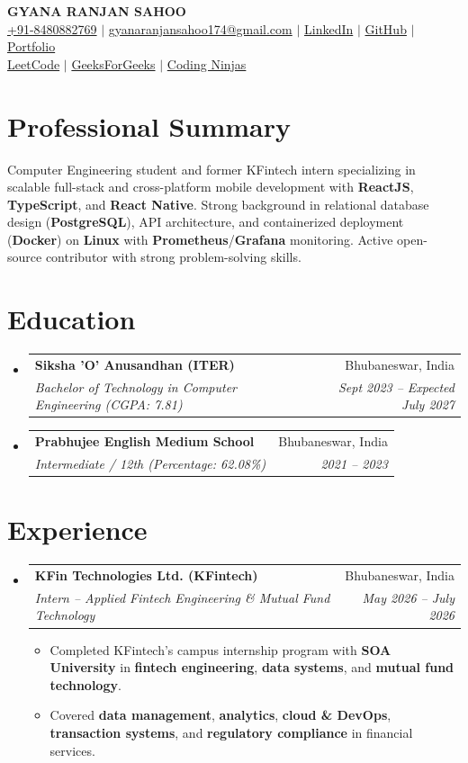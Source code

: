 \documentclass[10pt,a4paper]{article}
\makeatletter
\newcommand{\resumeItem}[1]{
  \item\small{#1}
}
\newcommand{\resumeSubheading}[4]{
  \vspace{-1pt}\item
    \begin{tabular*}{0.97\textwidth}[t]{l@{\extracolsep{\fill}}r}
      \textbf{#1} & #2 \\
      \textit{\small#3} & \textit{\small #4} \\
    \end{tabular*}\vspace{-2pt}
}
\makeatother
\begin{document}
\begin{center}
    {\Huge \scshape \textbf{GYANA RANJAN SAHOO}} \\ \vspace{2pt}
    \small
    \href{tel:+918480882769}{+91-8480882769} $|$
    \href{mailto:gyanaranjansahoo174@gmail.com}{gyanaranjansahoo174@gmail.com} $|$
    \href{https://linkedin.com/in/ranjangyana/}{LinkedIn} $|$
    \href{https://github.com/gyana-rj}{GitHub} $|$
    \href{https://devgyana.in}{Portfolio} \\ \vspace{2pt}
    \href{https://leetcode.com/u/gyana_rn/}{LeetCode} $|$
    \href{https://www.geeksforgeeks.org/profile/gyana_ranjan_s}{GeeksForGeeks} $|$
    \href{https://www.naukri.com/code360/profile/gyanarj}{Coding Ninjas}
\end{center}
\vspace{2pt}
\section{Professional Summary}
Computer Engineering student and former KFintech intern specializing in scalable full-stack and cross-platform mobile development with \textbf{ReactJS}, \textbf{TypeScript}, and \textbf{React Native}. Strong background in relational database design (\textbf{PostgreSQL}), API architecture, and containerized deployment (\textbf{Docker}) on \textbf{Linux} with \textbf{Prometheus}/\textbf{Grafana} monitoring. Active open-source contributor with strong problem-solving skills.
\section{Education}
\begin{itemize}[leftmargin=0.15in, label={}]
    \resumeSubheading
      {Siksha 'O' Anusandhan (ITER)}{Bhubaneswar, India}
      {Bachelor of Technology in Computer Engineering (CGPA: 7.81)}{Sept 2023 -- Expected July 2027}
    \resumeSubheading
      {Prabhujee English Medium School}{Bhubaneswar, India}
      {Intermediate / 12th (Percentage: 62.08\%)}{2021 -- 2023}
\end{itemize}
\section{Experience}
\begin{itemize}[leftmargin=0.15in, label={}]
    \resumeSubheading
      {KFin Technologies Ltd. (KFintech)}{Bhubaneswar, India}
      {Intern -- Applied Fintech Engineering \& Mutual Fund Technology}{May 2026 -- July 2026}
      \begin{itemize}
        \resumeItem{Completed KFintech's campus internship program with \textbf{SOA University} in \textbf{fintech engineering}, \textbf{data systems}, and \textbf{mutual fund technology}.}
        \resumeItem{Covered \textbf{data management}, \textbf{analytics}, \textbf{cloud \& DevOps}, \textbf{transaction systems}, and \textbf{regulatory compliance} in financial services.}
      \end{itemize}
\end{itemize}
\end{document}
